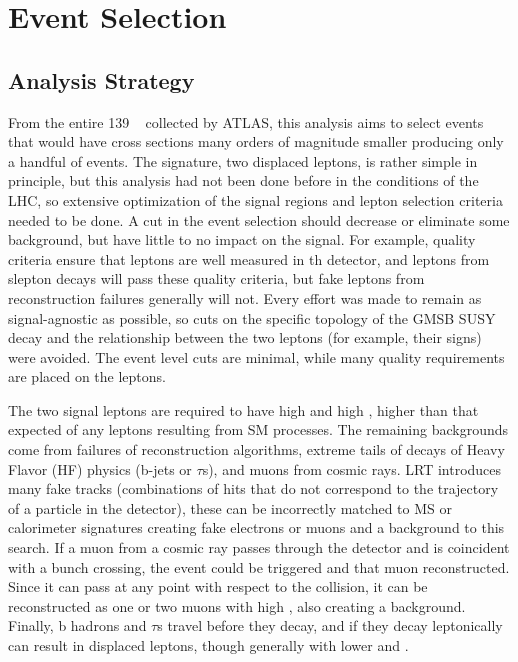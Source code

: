 \chapter{Event Selection}
\label{chap:event-selection}

\section{Analysis Strategy}

From the entire 139 \ifb~ collected by \ac{ATLAS}, this analysis aims to select events that would have cross sections many orders of magnitude smaller producing only a handful of events. The signature, two displaced leptons, is rather simple in principle, but this analysis had not been done before in the conditions of the \ac{LHC}, so extensive optimization of the signal regions and lepton selection criteria needed to be done. A cut in the event selection should decrease or eliminate some background, but have little to no impact on the signal. For example, quality criteria ensure that leptons are well measured in th detector, and leptons from slepton decays will pass these quality criteria, but fake leptons from reconstruction failures generally will not. Every effort was made to remain as signal-agnostic as possible, so cuts on the specific topology of the \ac{GMSB} \ac{SUSY} decay and the relationship between the two leptons (for example, their signs) were avoided. The event level cuts are minimal, while many quality requirements are placed on the leptons.

The two signal leptons are required to have high \pt and high \absdz, higher than that expected of any leptons resulting from \ac{SM} processes. The remaining backgrounds come from failures of reconstruction algorithms, extreme tails of decays of Heavy Flavor (HF) physics (b-jets or $\tau$s), and muons from cosmic rays. \ac{LRT} introduces many fake tracks (combinations of hits that do not correspond to the trajectory of a particle in the detector), these can be incorrectly matched to \ac{MS} or calorimeter signatures creating fake electrons or muons and a background to this search. If a muon from a cosmic ray passes through the detector and is coincident with a bunch crossing, the event could be triggered and that muon reconstructed. Since it can pass at any point with respect to the collision, it can be reconstructed as one or two muons with high \absdz, also creating a background. Finally, b hadrons and $\tau$s travel before they decay, and if they decay leptonically can result in displaced leptons, though generally with lower \pt and \absdz. 

